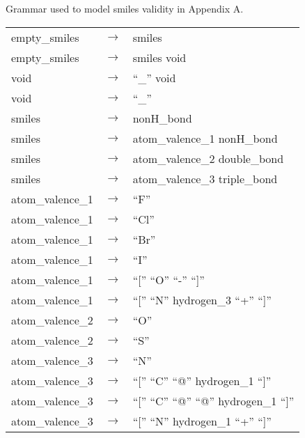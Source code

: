 \documentclass[../Document.tex]{subfiles}
\begin{document}

Grammar used to model \gls{smiles} validity in Appendix A\@.

\footnotesize
\begin{longtable}{m{} p{} p{}}
    empty\_smiles & $\rightarrow$ & smiles \\
    empty\_smiles & $\rightarrow$ & smiles void \\
    void & $\rightarrow$ & ``\_'' void \\
    void & $\rightarrow$ & ``\_'' \\
    smiles & $\rightarrow$ & nonH\_bond \\
    smiles & $\rightarrow$ & atom\_valence\_1 nonH\_bond \\
    smiles & $\rightarrow$ & atom\_valence\_2 double\_bond \\
    smiles & $\rightarrow$ & atom\_valence\_3 triple\_bond \\
    atom\_valence\_1 & $\rightarrow$ & ``F'' \\
    atom\_valence\_1 & $\rightarrow$ & ``Cl'' \\
    atom\_valence\_1 & $\rightarrow$ & ``Br'' \\
    atom\_valence\_1 & $\rightarrow$ & ``I'' \\
    atom\_valence\_1 & $\rightarrow$ & ``['' ``O'' ``-'' ``]'' \\
    atom\_valence\_1 & $\rightarrow$ & ``['' ``N'' hydrogen\_3 ``+'' ``]'' \\
    atom\_valence\_2 & $\rightarrow$ & ``O'' \\
    atom\_valence\_2 & $\rightarrow$ & ``S'' \\
    atom\_valence\_3 & $\rightarrow$ & ``N'' \\
    atom\_valence\_3 & $\rightarrow$ & ``['' ``C'' ``@'' hydrogen\_1 ``]'' \\
    atom\_valence\_3 & $\rightarrow$ & ``['' ``C'' ``@'' ``@'' hydrogen\_1 ``]'' \\
    atom\_valence\_3 & $\rightarrow$ & ``['' ``N'' hydrogen\_1 ``+'' ``]'' \\

\end{longtable}
\end{document}
